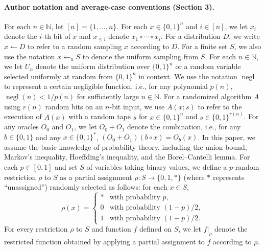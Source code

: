 \documentclass[10pt,a4paper]{article}
\begin{document}
\paragraph{Author notation and average-case conventions (Section 3).}
For each $n\in\mathbb N$, let $[n]=\{1,\ldots,n\}$. For each $x\in\{0,1\}^n$ and $i\in[n]$, we let $x_i$ denote the $i$-th bit of $x$ and $x_{\leq i}$ denote $x_1\circ\cdots\circ x_i$. For a distribution $D$, we write $x\leftarrow D$ to refer to a random sampling $x$ according to $D$. For a finite set $S$, we also use the notation $x\leftarrow_u S$ to denote the uniform sampling from $S$. For each $n\in\mathbb N$, we let $U_n$ denote the uniform distribution over $\{0,1\}^n$ or a random variable selected uniformly at random from $\{0,1\}^n$ in context. We use the notation $\operatorname{negl}$ to represent a certain negligible function, i.e., for any polynomial $p(n)$, $\operatorname{negl}(n)<1/p(n)$ for sufficiently large $n\in\mathbb N$. For a randomized algorithm $A$ using $r(n)$ random bits on an $n$-bit input, we use $A(x;s)$ to refer to the execution of $A(x)$ with a random tape $s$ for $x\in\{0,1\}^n$ and $s\in\{0,1\}^{r(n)}$.
For any oracles $O_0$ and $O_1$, we let $O_0+O_1$ denote the combination, i.e., for any $b\in\{0,1\}$ and any $x\in\{0,1\}^*$, $(O_0+O_1)(b\circ x)=O_b(x)$.
In this paper, we assume the basic knowledge of probability theory, including the union bound, Markov's inequality, Hoeffding's inequality, and the Borel--Cantelli lemma.
For each $p\in[0,1]$ and set $S$ of variables taking binary values, we define a $p$-random restriction $\rho$ to $S$ as a partial assignment $\rho:S\to\{0,1,*\}$ (where $*$ represents ``unassigned'') randomly selected as follows: for each $x\in S$,
\[\rho(x)=\begin{cases}*&\text{with probability }p,\\0&\text{with probability }(1-p)/2,\\1&\text{with probability }(1-p)/2.\end{cases}\]
For every restriction $\rho$ to $S$ and function $f$ defined on $S$, we let $f|_\rho$ denote the restricted function obtained by applying a partial assignment to $f$ according to $\rho$.
\end{document}
